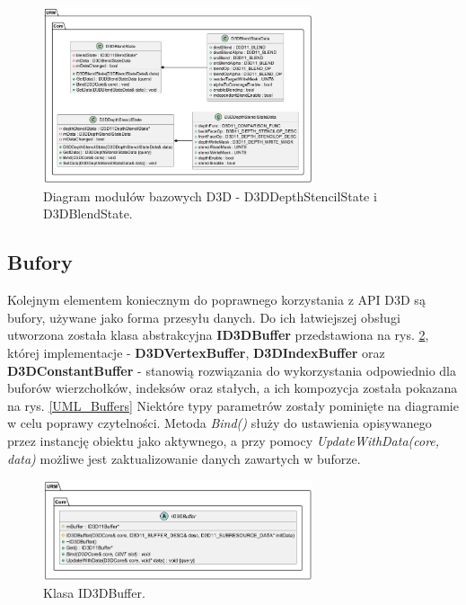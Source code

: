 	\begin{figure}[h!]
		\centering
		\includegraphics[width=300px]{images/UML/d3dutils_2.png}
		\caption{Diagram modułów bazowych D3D - D3DDepthStencilState i D3DBlendState.}
		\label{UML_D3DUtils_2}
	\end{figure}
	
	\vfill
	\clearpage
	
\subsection{Bufory}
	Kolejnym elementem koniecznym do poprawnego korzystania z API D3D są bufory, używane jako forma przesyłu danych.
	Do ich łatwiejszej obsługi utworzona została klasa abstrakcyjna \textbf{ID3DBuffer} przedstawiona na rys. \ref{UML_Buffer}, której implementacje - \textbf{D3DVertexBuffer}, \textbf{D3DIndexBuffer} oraz \textbf{D3DConstantBuffer} - stanowią rozwiązania do wykorzystania odpowiednio dla buforów wierzchołków, indeksów oraz stałych, a ich kompozycja została pokazana na rys. \ref{UML_Buffers}
	Niektóre typy parametrów zostały pominięte na diagramie w celu poprawy czytelności.
	Metoda \textit{Bind()} służy do ustawienia opisywanego przez instancję obiektu jako aktywnego, a przy pomocy \textit{UpdateWithData(core, data)} możliwe jest zaktualizowanie danych zawartych w buforze.
		
	\begin{figure}[h!]
		\centering
		\includegraphics[width=300px]{images/UML/buffer.png}
		\caption{Klasa ID3DBuffer.}
		\label{UML_Buffer}
	\end{figure}
	
